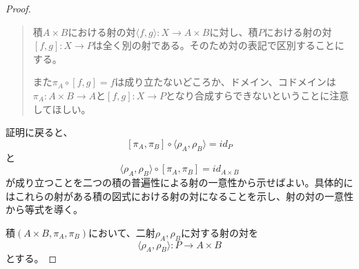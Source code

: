 \documentclass[uplatex,dvipdfmx]{jsarticle}
\newcommand{\arrow}{\rightarrow}
\newcommand{\tuple}[1]{\langle #1\rangle}
\newcommand{\mor}[3]{#1:#2\arrow #3}
\newtheorem{proof}{証明}[section]
\numberwithin{proof}{subsection}
\numberwithin{prop}{subsection}
\numberwithin{define}{subsection}
\begin{document}
\begin{proof}
\begin{quote}
			積$A\times B$における射の対$\mor{\tuple{f,g}}{X}{A\times B}$に対し、積$P$における射の対$\mor{[f,g]}{X}{P}$は全く別の射である。そのため対の表記で区別することにする。

			また$\pi_A\circ[f,g]=f$は成り立たないどころか、ドメイン、コドメインは$\mor{\pi_A}{A\times B}{A}$と$\mor{[f,g]}{X}{P}$となり合成すらできないということに注意してほしい。
		\end{quote}
		証明に戻ると、\[[\pi_A,\pi_B]\circ\tuple{\rho_A,\rho_B}=id_P\]と
		\[\tuple{\rho_A,\rho_B}\circ[\pi_A,\pi_B]=id_{A\times B}\]が成り立つことを二つの積の普遍性による射の一意性から示せばよい。具体的にはこれらの射がある積の図式における射の対になることを示し、射の対の一意性から等式を導く。

		積$(A\times B,\pi_A,\pi_B)$において、二射$\rho_A,\rho_B$に対する射の対を\[\mor{\tuple{\rho_A,\rho_B}}{P}{A\times B}\]とする。


\end{proof}
\end{document}
